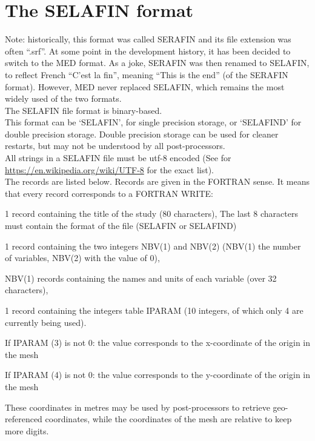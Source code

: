 \chapter{The SELAFIN format}\label{sec:srffmt}

Note: historically, this format was called SERAFIN and its file extension was
often ``.srf''. At some point in the \telemacsystem development history, it has
been decided to switch to the MED format. As a joke, SERAFIN was then renamed
to SELAFIN, to reflect French ``C'est la fin'', meaning ``This is the end'' (of
the SERAFIN format). However, MED never replaced SELAFIN, which remains the
most widely used of the two formats.\\

The SELAFIN file format is binary-based.\\

This format can be `SELAFIN', for single precision storage, or `SELAFIND' for
double precision storage. Double precision storage can be used for cleaner
restarts, but may not be understood by all post-processors.\\

All strings in a SELAFIN file must be utf-8 encoded (See for
\url{https://en.wikipedia.org/wiki/UTF-8} for the exact list).\\

The records are listed below. Records are given in the FORTRAN sense. It means
that every record corresponds to a FORTRAN WRITE:

1 record containing the title of the study (80 characters), The last 8
characters must contain the format of the file (SELAFIN or SELAFIND)

1 record containing the two integers NBV(1) and
NBV(2) (NBV(1) the number of variables, NBV(2)
with the value of 0),

NBV(1) records containing the names and units of each variable (over 32
characters),

1 record containing the integers table IPARAM (10 integers, of which only 4 are
currently being used).

If IPARAM (3) is not 0: the value corresponds to the x-coordinate of the origin
in the mesh

If IPARAM (4) is not 0: the value corresponds to the y-coordinate of the origin
in the mesh

These coordinates in metres may be used by post-processors to retrieve
geo-referenced coordinates, while the coordinates of the mesh are relative to
keep more digits.

